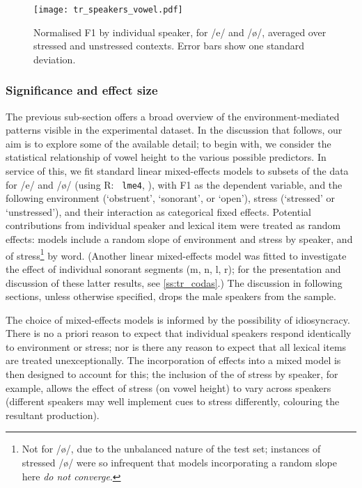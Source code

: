 \begin{figure}[ht]
  \texttt{[image: tr\_speakers\_vowel.pdf]}
  \caption[Normalised F1 by individual speaker, for /e/ and /ø/.]{Normalised F1 by individual speaker, for /e/ and /ø/, averaged over stressed and unstressed contexts. Error bars show one standard deviation.}
  \label{fig:tr_speakers_individual}
\end{figure}

\subsubsection{Significance and effect size}

The previous sub-section offers a broad overview of the environment-mediated patterns visible in the experimental dataset. In the discussion that follows, our aim is to explore some of the available detail; to begin with, we consider the statistical relationship of vowel height to the various possible predictors. In service of this, we fit standard linear mixed-effects models to subsets of the data for /e/ and /\o/ (using R: \texttt{ lme4}, \citealt{lme4}), with F1 as the dependent variable, and the following environment (`obstruent', `sonorant', or `open'), stress (`stressed' or `unstressed'), and their interaction as categorical fixed effects. Potential contributions from individual speaker and lexical item were treated as random effects: models include a random slope of environment and stress by speaker, and of stress\footnote{Not for /ø/, due to the unbalanced nature of the test set; instances of stressed /ø/ were so infrequent that models incorporating a random slope here \emph{do not converge}.} by word. (Another linear mixed-effects model was fitted to investigate the effect of individual sonorant segments (m, n, l, r); for the presentation and discussion of these latter results, see \cref{ss:tr_codas}.) The discussion in following sections, unless otherwise specified, drops the male speakers from the sample.

The choice of mixed-effects models is informed by the possibility of idiosyncracy. There is no a priori reason to expect that individual speakers respond identically to environment or stress; nor is there any reason to expect that all lexical items are treated unexceptionally. The incorporation of  effects into a mixed model is then designed to account for this; the inclusion of the  of stress by speaker, for example, allows the effect of stress (on vowel height) to vary across speakers (different speakers may well implement cues to stress differently, colouring the resultant production).

